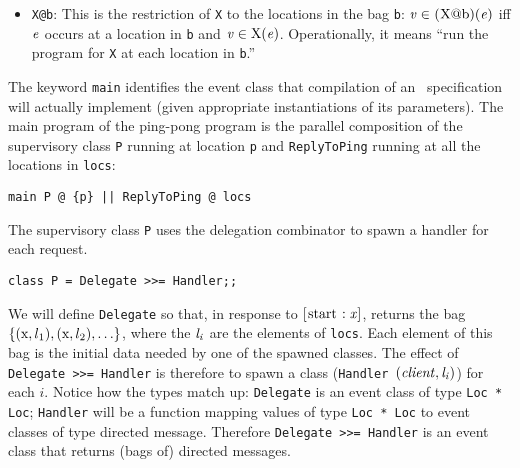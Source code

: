 \documentclass[final]{article}
\newcommand{\dgclassrel}[3]{\NUPRLclassrel{}{#1}{}{#2}{#3}}
\newcommand{\vXe}%
 {\ensuremath{\dgclassrel{\NUPRLevent}{\text{\lstinline{X}}}{\NUPRL{v}}}}
\newcommand{\listinline}[1]{\text{\lstinline{#1}}}
\newcommand{\msg}[2]{\ensuremath{[\listinline{#1}:\NUPRL{#2}]}}
\begin{document}
\begin{itemize}
\item
\lstinline{X@b}:%
%
%
%
This is the restriction of \lstinline{X} to the locations in the bag
\lstinline{b}:
$\dgclassrel{\NUPRLevent}{\listinline{(X@b)}}{\NUPRL{v}}$ iff
$\mathit{e}$ occurs at a location in \lstinline{b} and \vXe.
Operationally, it means ``run the program for \lstinline{X} at each
location in \lstinline{b}.''
\end{itemize}
%

\label{main}
%
%

The keyword \lstinline{main} identifies the event class that
compilation of an \eml\ specification will actually implement (given
appropriate instantiations of its parameters).
The main program of the ping-pong program is the parallel composition
of the supervisory class \lstinline{P} running at location
\lstinline{p} and \lstinline{ReplyToPing} running at all the locations
in \lstinline{locs}:
\begin{emlcode}
\begin{lstlisting}
main P @ {p} || ReplyToPing @ locs
\end{lstlisting}
\end{emlcode}


The supervisory class \lstinline{P} uses the delegation combinator%
%
%
to spawn a handler for each request.
\begin{emlcode}
\begin{lstlisting}
class P = Delegate >>= Handler;;
\end{lstlisting}
\end{emlcode}
We will define \lstinline{Delegate} so that, in response to
\msg{start}{x}, returns the bag \(\{(\listinline{x},l_1),
(\listinline{x},l_2), \ldots\}\), where the $\mathit{l_i}$ are the
elements of \lstinline{locs}.  Each element of this bag is the initial
data needed by one of the spawned classes.  The effect of
\lstinline{Delegate >>= Handler} is therefore to spawn a class
(\lstinline{Handler}~$\mathit{(client,l_i)}$) for each $i$.  Notice how
the types match up: \lstinline{Delegate} is an event class of type
\lstinline{Loc * Loc}; \lstinline{Handler} will be a function mapping
values of type \lstinline{Loc * Loc} to event classes of type directed
message.  Therefore
%
\lstinline{Delegate >>= Handler} is an event class that returns (bags
of) directed messages.
\end{document}
